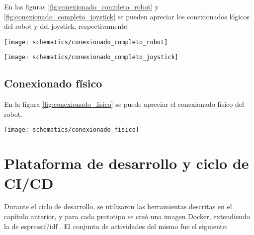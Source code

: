 En las figuras \ref{fig:conexionado_completo_robot} y \ref{fig:conexionado_completo_joystick} se pueden apreciar los conexionados lógicos del robot y del joystick, respectivamente.

\begin{center}
\texttt{[image: schematics/conexionado\_completo\_robot]}
  \label{fig:conexionado_completo_robot}
\end{center}


\begin{center}
\texttt{[image: schematics/conexionado\_completo\_joystick]}
  \label{fig:conexionado_completo_joystick}
\end{center}


\subsection{Conexionado físico}

En la figura \ref{fig:conexionado_fisico} se puede apreciar el conexionado físico del robot.

\begin{center}
\texttt{[image: schematics/conexionado\_fisico]}
  \label{fig:conexionado_fisico}
\end{center}

\vspace{2cm}



\section{Plataforma de desarrollo y ciclo de CI/CD}

Durante el ciclo de desarrollo, se utilizaron las herramientas descritas en el capítulo anterior, y para cada prototipo se creó una imagen Docker, extendiendo la de espressif/idf \cite{Espressif_docker_image}. El conjunto de actividades del mismo fue el siguiente:


